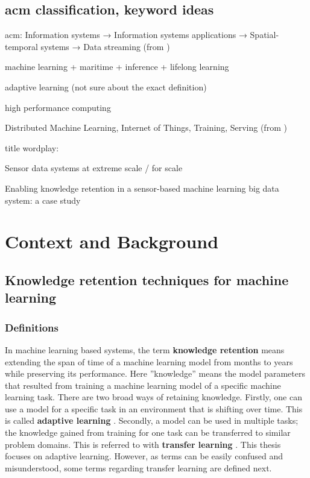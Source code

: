 \section{acm classification,  keyword ideas}

acm:
Information systems → Information systems applications →
Spatial-temporal systems → Data streaming (from \cite{uprctrajectorysystem})

machine learning + maritime + inference + lifelong learning

adaptive learning (not sure about the exact definition)

high performance computing

Distributed Machine Learning, Internet of Things, Training, Serving (from \cite{mliot})

title wordplay:

Sensor data systems at extreme scale / for scale

Enabling knowledge retention in a sensor-based machine learning big data system: a case study

\chapter{Context and Background}

\section{Knowledge retention techniques for machine learning}

\subsection{Definitions}




In machine learning based systems, the term \textbf{knowledge retention} means extending the span of time of a machine learning model from months to years while preserving its performance. Here ''knowledge'' means the model parameters that resulted from training a machine learning model of a specific machine learning task. There are two broad ways of retaining knowledge. Firstly, one can use a model for a specific task in an environment that is shifting over time. This is called \textbf{adaptive learning} \cite{conceptdriftsurvey}. Secondly, a model can be used in multiple tasks; the knowledge gained from training for one task can be transferred to similar problem domains. This is referred to with \textbf{transfer learning} \cite{lmlsystems}.
This thesis focuses on adaptive learning. However, as terms can be easily confused and misunderstood, some terms regarding transfer learning are defined next.

